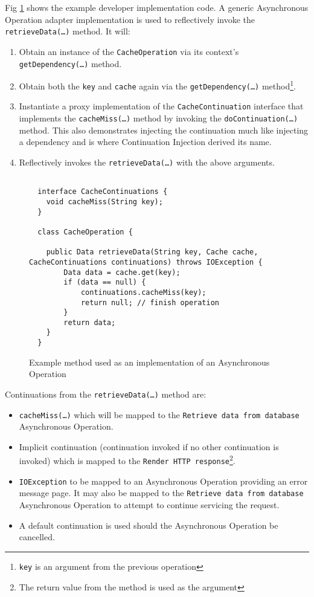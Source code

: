 \documentclass[prodmode]{style/acmlarge}
\begin{document}
Fig \ref{fig:Example_Method_Operation} shows the example developer
implementation code.  A generic Asynchronous Operation adapter implementation is
used to reflectively invoke the \texttt{retrieveData(\ldots)} method. It will:
\begin{enumerate}
  \item Obtain an instance of the \texttt{CacheOperation} via its context's \texttt{getDependency(\ldots)} method.
  \item Obtain both the \texttt{key} and \texttt{cache} again via the \texttt{getDependency(\ldots)} method\footnote{\texttt{key} is an argument from the previous operation}.
  \item Instantiate a proxy implementation of the \texttt{CacheContinuation} interface that implements the \texttt{cacheMiss(\ldots)} method by invoking the \texttt{doContinuation(\ldots)} method.  This also demonstrates injecting the continuation much like injecting a dependency and is where Continuation Injection derived its name. 
  \item Reflectively invokes the \texttt{retrieveData(\ldots)} with the above arguments.
\end{enumerate}

\begin{figure}[tp]
\centering
\begin{verbatim}

  interface CacheContinuations {
    void cacheMiss(String key);
  }

  class CacheOperation {
    
    public Data retrieveData(String key, Cache cache, CacheContinuations continuations) throws IOException {
        Data data = cache.get(key);
        if (data == null) {
            continuations.cacheMiss(key);
            return null; // finish operation
        }
        return data;
    }
  }
\end{verbatim}
\caption{Example method used as an implementation of an Asynchronous Operation}
\label{fig:Example_Method_Operation}
\end{figure}

Continuations from the \texttt{retrieveData(\ldots)} method are:
\begin{itemize}
  \item \texttt{cacheMiss(\ldots)} which will be mapped to the \texttt{Retrieve data from database} Asynchronous Operation.
  \item Implicit continuation (continuation invoked if no other continuation is invoked) which is mapped to the \texttt{Render HTTP response}\footnote{The return value from the method is used as the argument}.
  \item \texttt{IOException} to be mapped to an Asynchronous Operation providing an error message page.  It may also be mapped to the \texttt{Retrieve data from database} Asynchronous Operation to attempt to continue servicing the request.
  \item A default continuation is used should the Asynchronous Operation be cancelled.
\end{itemize}
\end{document}

